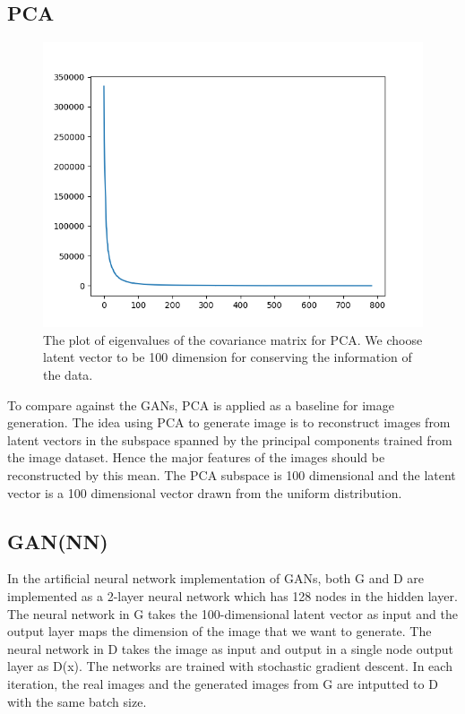 \documentclass[10pt,twocolumn,letterpaper]{article}
\begin{document}
\subsection{PCA}
\begin{figure}[h]
\begin{center}
   \includegraphics[width=0.8\linewidth]{img/pcaeigplot.png}
\end{center}
   \caption{The plot of eigenvalues of the covariance matrix for PCA. We choose latent vector to be 100 dimension for conserving the information of the data.}
\label{fig:long}
\label{fig:onecol}
\end{figure}
To compare against the GANs, PCA is applied as a baseline for image generation. The idea using PCA to generate image is to reconstruct images from latent vectors in the subspace spanned by the principal components trained from the image dataset. Hence the major features of the images should be reconstructed by this mean. The PCA subspace is 100 dimensional and the latent vector is a 100 dimensional vector drawn from the uniform distribution.
\subsection{GAN(NN)}
In the artificial neural network implementation of GANs, both G and D are implemented as a 2-layer neural network which has 128 nodes in the hidden layer. The neural network in G takes the 100-dimensional latent vector as input and the output layer maps the dimension of the image that we want to generate. The neural network in D takes the image as input and output in a single node output layer as D(x). The networks are trained with stochastic gradient descent. In each iteration, the real images and the generated images from G are intputted to D with the same batch size.
\end{document}
